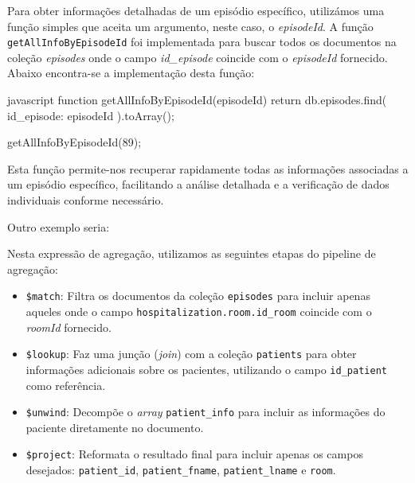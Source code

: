 Para obter informações detalhadas de um episódio específico, utilizámos uma função simples que aceita um argumento, neste caso, o \textit{episodeId}. A função \texttt{getAllInfoByEpisodeId} foi implementada para buscar todos os documentos na coleção \textit{episodes} onde o campo \textit{id\_episode} coincide com o \textit{episodeId} fornecido. Abaixo encontra-se a implementação desta função:

\begin{myminted}{javascript}
function getAllInfoByEpisodeId(episodeId) {
    return db.episodes.find({
        id_episode: episodeId
    }).toArray();
}

getAllInfoByEpisodeId(89);
\end{myminted}

Esta função permite-nos recuperar rapidamente todas as informações associadas a um episódio específico, facilitando a análise detalhada e a verificação de dados individuais conforme necessário.

Outro exemplo seria:


Nesta expressão de agregação, utilizamos as seguintes etapas do pipeline de agregação:

\begin{itemize}
    \item \texttt{\$match}: Filtra os documentos da coleção \texttt{episodes} para incluir apenas aqueles onde o campo \texttt{hospitalization.room.id\_room} coincide com o \textit{roomId} fornecido.
    \item \texttt{\$lookup}: Faz uma junção (\textit{join}) com a coleção \texttt{patients} para obter informações adicionais sobre os pacientes, utilizando o campo \texttt{id\_patient} como referência.
    \item \texttt{\$unwind}: Decompõe o \textit{array} \texttt{patient\_info} para incluir as informações do paciente diretamente no documento.
    \item \texttt{\$project}: Reformata o resultado final para incluir apenas os campos desejados: \texttt{patient\_id}, \texttt{patient\_fname}, \texttt{patient\_lname} e \texttt{room}.
\end{itemize}


